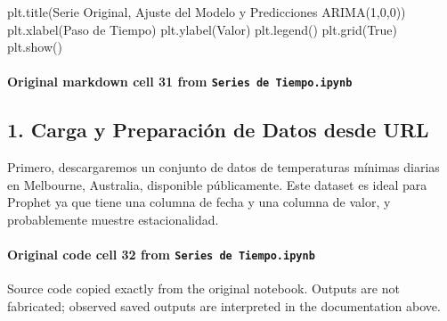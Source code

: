 \documentclass[
  11pt,
]{article}
\newenvironment{Shaded}{}{}
\newcommand{\NormalTok}[1]{#1}
\newcommand{\StringTok}[1]{\textcolor[rgb]{0.25,0.44,0.63}{#1}}
\newcommand{\VariableTok}[1]{\textcolor[rgb]{0.10,0.09,0.49}{#1}}
\begin{document}
\begin{Shaded}
\begin{Highlighting}[]
\NormalTok{plt.title(}\StringTok{\textquotesingle{}Serie Original, Ajuste del Modelo y Predicciones ARIMA(1,0,0)\textquotesingle{}}\NormalTok{)}
\NormalTok{plt.xlabel(}\StringTok{\textquotesingle{}Paso de Tiempo\textquotesingle{}}\NormalTok{)}
\NormalTok{plt.ylabel(}\StringTok{\textquotesingle{}Valor\textquotesingle{}}\NormalTok{)}
\NormalTok{plt.legend()}
\NormalTok{plt.grid(}\VariableTok{True}\NormalTok{)}
\NormalTok{plt.show()}
\end{Highlighting}
\end{Shaded}

\paragraph{\texorpdfstring{Original markdown cell 31 from \texttt{Series\ de\ Tiempo.ipynb}}{Original markdown cell 31 from Series de Tiempo.ipynb}}\label{original-markdown-cell-31-from-series-de-tiempoipynb}

\subsection{1. Carga y Preparación de Datos desde URL}\label{1-carga-y-preparaciuxf3n-de-datos-desde-url}

Primero, descargaremos un conjunto de datos de temperaturas mínimas diarias en Melbourne, Australia, disponible públicamente. Este dataset es ideal para Prophet ya que tiene una columna de fecha y una columna de valor, y probablemente muestre estacionalidad.

\paragraph{\texorpdfstring{Original code cell 32 from \texttt{Series\ de\ Tiempo.ipynb}}{Original code cell 32 from Series de Tiempo.ipynb}}\label{original-code-cell-32-from-series-de-tiempoipynb}

Source code copied exactly from the original notebook. Outputs are not fabricated; observed saved outputs are interpreted in the documentation above.
\end{document}
